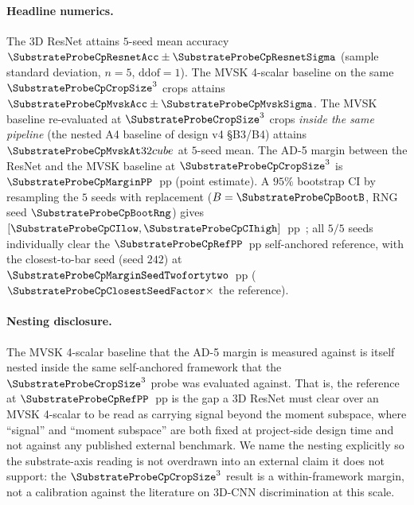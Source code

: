 \paragraph{Headline numerics.}
The 3D ResNet attains $5$-seed mean accuracy $\SubstrateProbeCpResnetAcc \pm \SubstrateProbeCpResnetSigma$ (sample standard deviation, $n=5$, $\mathrm{ddof}=1$). The MVSK 4-scalar baseline on the same $\SubstrateProbeCpCropSize^3$ crops attains $\SubstrateProbeCpMvskAcc \pm \SubstrateProbeCpMvskSigma$. The MVSK baseline re-evaluated at $\SubstrateProbeCropSize^3$ crops \emph{inside the same pipeline} (the nested A4 baseline of design v4 §B3/B4) attains $\SubstrateProbeCpMvskAt32cube$ at $5$-seed mean. The AD-5 margin between the ResNet and the MVSK baseline at $\SubstrateProbeCpCropSize^3$ is $\SubstrateProbeCpMarginPP$~pp (point estimate). A $95\%$ bootstrap CI by resampling the $5$ seeds with replacement ($B=\SubstrateProbeCpBootB$, RNG seed $\SubstrateProbeCpBootRng$) gives $[\SubstrateProbeCpCIlow, \SubstrateProbeCpCIhigh]$~pp~\cite{politis_romano1994}; all $5/5$ seeds individually clear the $\SubstrateProbeCpRefPP$~pp self-anchored reference, with the closest-to-bar seed (seed $242$) at $\SubstrateProbeCpMarginSeedTwofortytwo$~pp ($\SubstrateProbeCpClosestSeedFactor\times$ the reference).

\paragraph{Nesting disclosure.}
The MVSK 4-scalar baseline that the AD-5 margin is measured against is itself nested inside the same self-anchored framework that the $\SubstrateProbeCropSize^3$ probe was evaluated against. That is, the reference at $\SubstrateProbeCpRefPP$~pp is the gap a 3D ResNet must clear over an MVSK 4-scalar to be read as carrying signal beyond the moment subspace, where ``signal'' and ``moment subspace'' are both fixed at project-side design time and not against any published external benchmark. We name the nesting explicitly so the substrate-axis reading is not overdrawn into an external claim it does not support: the $\SubstrateProbeCpCropSize^3$ result is a within-framework margin, not a calibration against the literature on 3D-CNN discrimination at this scale.

